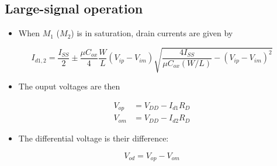 \documentclass[11pt]{article}
\providecommand{\tightlist}{%
      \setlength{\itemsep}{0pt}\setlength{\parskip}{0pt}}
\begin{document}
    \hypertarget{large-signal-operation}{%
\subsection{Large-signal operation}\label{large-signal-operation}}

    \begin{itemize}
\tightlist
\item
  When \(M_1\) (\(M_2\)) is in saturation, drain currents are given by
\end{itemize}

\begin{equation}
I_{d1,2} = \dfrac{I_{SS}}{2} \pm \dfrac{\mu C_{ox}}{4}\dfrac{W}{L}(V_{ip}-V_{im})\sqrt{\dfrac{4I_{SS}}{\mu C_{ox} (W/L)} - (V_{ip} - V_{im})^2}
\end{equation}

\begin{itemize}
\tightlist
\item
  The ouput voltages are then
\end{itemize}

\begin{align}
V_{op} &= V_{DD} - I_{d1}R_D\\
V_{om} &= V_{DD} - I_{d2}R_D
\end{align}

\begin{itemize}
\tightlist
\item
  The differential voltage is their difference:
\end{itemize}

\begin{equation}
V_{od} = V_{op} - V_{om}
\end{equation}
\end{document}
